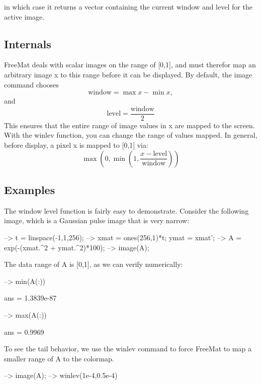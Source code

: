  in which case it returns a vector containing the current window and level for the active image. \hypertarget{transforms_svd_Function}{}\subsection{Internals}\label{transforms_svd_Function}
Free\-Mat deals with scalar images on the range of {\ttfamily \mbox{[}0,1\mbox{]}}, and must therefor map an arbitrary image {\ttfamily x} to this range before it can be displayed. By default, the {\ttfamily image} command chooses \[ \mathrm{window} = \max x - \min x, \] and \[ \mathrm{level} = \frac{\mathrm{window}}{2} \] This ensures that the entire range of image values in {\ttfamily x} are mapped to the screen. With the {\ttfamily winlev} function, you can change the range of values mapped. In general, before display, a pixel {\ttfamily x} is mapped to {\ttfamily \mbox{[}0,1\mbox{]}} via\-: \[ \max\left(0,\min\left(1,\frac{x - \mathrm{level}}{\mathrm{window}} \right)\right) \] \hypertarget{variables_matrix_Examples}{}\subsection{Examples}\label{variables_matrix_Examples}
The window level function is fairly easy to demonstrate. Consider the following image, which is a Gaussian pulse image that is very narrow\-:


\begin{DoxyVerbInclude}
--> t = linspace(-1,1,256);
--> xmat = ones(256,1)*t; ymat = xmat';
--> A = exp(-(xmat.^2 + ymat.^2)*100);
--> image(A);
\end{DoxyVerbInclude}


The data range of {\ttfamily A} is {\ttfamily \mbox{[}0,1\mbox{]}}, as we can verify numerically\-:


\begin{DoxyVerbInclude}
--> min(A(:))

ans = 
 1.3839e-87 

--> max(A(:))

ans = 
    0.9969 
\end{DoxyVerbInclude}


To see the tail behavior, we use the {\ttfamily winlev} command to force Free\-Mat to map a smaller range of {\ttfamily A} to the colormap.


\begin{DoxyVerbInclude}
--> image(A);
--> winlev(1e-4,0.5e-4)
\end{DoxyVerbInclude}


